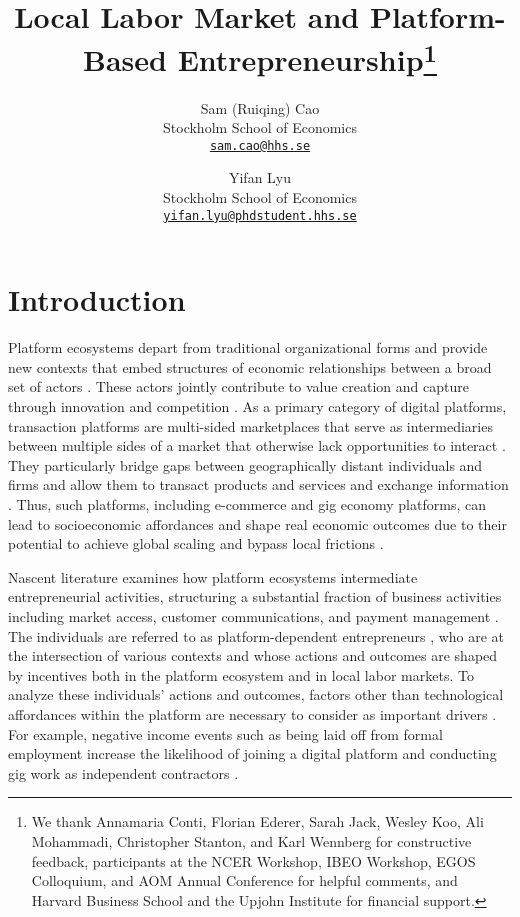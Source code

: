 \documentclass[letterpaper,12pt]{article}
\title{Local Labor Market and Platform-Based Entrepreneurship\thanks{We thank Annamaria Conti, Florian Ederer, Sarah Jack, Wesley Koo, Ali Mohammadi, Christopher Stanton, and Karl Wennberg for constructive feedback, participants at the NCER Workshop, IBEO Workshop, EGOS Colloquium, and AOM Annual Conference for helpful comments, and Harvard Business School and the Upjohn Institute for financial support.}}
\author{
  \vspace{-0.8em} Sam (Ruiqing) Cao \\ \vspace{-0.8em} Stockholm School of Economics \\ \texttt{\protect\href{mailto:sam.cao@hhs.se}{sam.cao@hhs.se}}
  \and 
  \hspace{1.8em} \vspace{-0.8em} Yifan Lyu \\ \hspace{1.8em} \vspace{-0.8em} Stockholm School of Economics \\ \hspace{1.8em} \texttt{\protect\href{mailto:yifan.lyu@phdstudent.hhs.se}{yifan.lyu@phdstudent.hhs.se}}
}
\date{}
\begin{document}
\maketitle


\section{Introduction}



Platform ecosystems depart from traditional organizational forms and provide new contexts that embed structures of economic relationships between a broad set of actors \citep{mcintyre_multisided_2021,jacobides_towards_2018,kretschmer_platform_2021}. These actors jointly contribute to value creation and capture through innovation and competition \citep{gawer_bridging_2014}. As a primary category of digital platforms, transaction platforms are multi-sided marketplaces that serve as intermediaries between multiple sides of a market that otherwise lack opportunities to interact \citep{rochet_platform_2003}. They particularly bridge gaps between geographically distant individuals and firms and allow them to transact products and services and exchange information \citep{afuah_crowdsourcing_2012,cusumano_business_2019}. Thus, such platforms, including e-commerce and gig economy platforms, can lead to socioeconomic affordances and shape real economic outcomes due to their potential to achieve global scaling and bypass local frictions \citep{bonina_digital_2021}.

Nascent literature examines how platform ecosystems intermediate entrepreneurial activities, structuring a substantial fraction of business activities including market access, customer communications, and payment management \citep{bearson_measuring_2021,eckhardt_open_2018}. The individuals are referred to as platform-dependent entrepreneurs \citep{cutolo_platform-dependent_2021}, who are at the intersection of various contexts and whose actions and outcomes are shaped by incentives both in the platform ecosystem and in local labor markets. To analyze these individuals’ actions and outcomes, factors other than technological affordances within the platform are necessary to consider as important drivers \citep{nambisan_costs_2021}. For example, negative income events such as being laid off from formal employment increase the likelihood of joining a digital platform and conducting gig work as independent contractors \citep{garin_is_2020,huang_unemployment_2020,jackson_availability_2022,laitenberger2023unemployment}.
\end{document}
